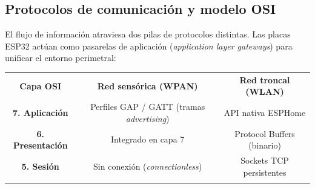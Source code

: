 \subsection{Protocolos de comunicación y modelo OSI}
El flujo de información atraviesa dos pilas de protocolos distintas. Las placas ESP32 actúan como pasarelas de aplicación (\textit{application layer gateways}) para unificar el entorno perimetral:

\begin{table}[H]
    \centering
    \setlength{\tabcolsep}{4pt}
    \renewcommand{\arraystretch}{1.2}
    \begin{tabular}{|c|c|c|}
        \hhline{|-|-|-|}
        \rowcolor[gray]{0.9} 
        \parbox[c]{3.5cm}{\vspace{0.2cm}\centering\textbf{Capa OSI}\vspace{0.2cm}} & \parbox[c]{5.25cm}{\vspace{0.2cm}\centering\textbf{Red sensórica (WPAN)}\vspace{0.2cm}} & \parbox[c]{5.25cm}{\vspace{0.2cm}\centering\textbf{Red troncal (WLAN)}\vspace{0.2cm}} \\ \hhline{|-|-|-|}
        \parbox[c]{3.5cm}{\vspace{0.2cm}\centering\textbf{7. Aplicación}\vspace{0.2cm}} & \parbox[c]{5.25cm}{\vspace{0.2cm}\centering Perfiles GAP / GATT (tramas \textit{advertising})\vspace{0.2cm}} & \parbox[c]{5.25cm}{\vspace{0.2cm}\centering API nativa ESPHome\vspace{0.2cm}} \\ \hhline{|-|-|-|}
        \parbox[c]{3.5cm}{\vspace{0.2cm}\centering\textbf{6. Presentación}\vspace{0.2cm}} & \parbox[c]{5.25cm}{\vspace{0.2cm}\centering Integrado en capa 7\vspace{0.2cm}} & \parbox[c]{5.25cm}{\vspace{0.2cm}\centering Protocol Buffers (binario)\vspace{0.2cm}} \\ \hhline{|-|-|-|}
        \parbox[c]{3.5cm}{\vspace{0.2cm}\centering\textbf{5. Sesión}\vspace{0.2cm}} & \parbox[c]{5.25cm}{\vspace{0.2cm}\centering Sin conexión (\textit{connectionless})\vspace{0.2cm}} & \parbox[c]{5.25cm}{\vspace{0.2cm}\centering Sockets TCP persistentes\vspace{0.2cm}} \\ \hhline{|-|-|-|}

\end{tabular}
\end{table}
